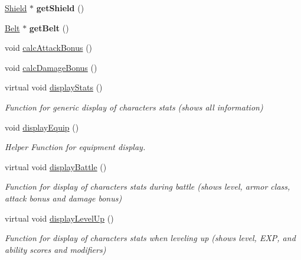 \begin{DoxyCompactItemize}
\hyperlink{class_shield}{Shield} $\ast$ {\bfseries get\+Shield} ()
\item 
\hypertarget{class_characters_a0f32959981f93b31889eed35f257f4c6}{}\label{class_characters_a0f32959981f93b31889eed35f257f4c6} 
\hyperlink{class_belt}{Belt} $\ast$ {\bfseries get\+Belt} ()
\item 
void \hyperlink{class_characters_aafcca03cc72ce2b389c0412229864c6e}{calc\+Attack\+Bonus} ()
\item 
void \hyperlink{class_characters_af750209704e0be8b911cbc29fc1362ee}{calc\+Damage\+Bonus} ()
\item 
\hypertarget{class_characters_adc5a2d1c1aabab2b9915f5ce0e2707f9}{}\label{class_characters_adc5a2d1c1aabab2b9915f5ce0e2707f9} 
virtual void \hyperlink{class_characters_adc5a2d1c1aabab2b9915f5ce0e2707f9}{display\+Stats} ()
\begin{DoxyCompactList}\small\item\em Function for generic display of character\textquotesingle{}s stats (shows all information) \end{DoxyCompactList}\item 
\hypertarget{class_characters_acf1c5f4228c0ac33361c0ad5211aa7a9}{}\label{class_characters_acf1c5f4228c0ac33361c0ad5211aa7a9} 
void \hyperlink{class_characters_acf1c5f4228c0ac33361c0ad5211aa7a9}{display\+Equip} ()
\begin{DoxyCompactList}\small\item\em Helper Function for equipment display. \end{DoxyCompactList}\item 
\hypertarget{class_characters_ad40703d40e67cf8d99e4de9624c1ba8a}{}\label{class_characters_ad40703d40e67cf8d99e4de9624c1ba8a} 
virtual void \hyperlink{class_characters_ad40703d40e67cf8d99e4de9624c1ba8a}{display\+Battle} ()
\begin{DoxyCompactList}\small\item\em Function for display of character\textquotesingle{}s stats during battle (shows level, armor class, attack bonus and damage bonus) \end{DoxyCompactList}\item 
\hypertarget{class_characters_a99a811e64beaa78d8d1bd5186199e174}{}\label{class_characters_a99a811e64beaa78d8d1bd5186199e174} 
virtual void \hyperlink{class_characters_a99a811e64beaa78d8d1bd5186199e174}{display\+Level\+Up} ()
\begin{DoxyCompactList}\small\item\em Function for display of character\textquotesingle{}s stats when leveling up (shows level, E\+XP, and ability scores and modifiers) \end{DoxyCompactList}\item 

\end{DoxyCompactItemize}
